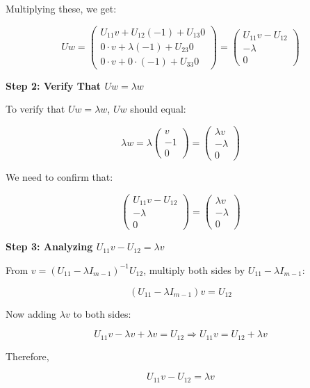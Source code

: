 \documentclass[8pt]{article}
\begin{document}
{{Multiplying these, we get:

\[
Uw = \begin{pmatrix}
U_{11}v + U_{12}(-1) + U_{13}0 \\
0 \cdot v + \lambda(-1) + U_{23}0 \\
0 \cdot v + 0 \cdot (-1) + U_{33}0
\end{pmatrix} = \begin{pmatrix}
U_{11}v - U_{12} \\
-\lambda \\
0
\end{pmatrix}
\]

\textbf{Step 2: Verify That \(Uw = \lambda w\)}

To verify that \(Uw = \lambda w\), \(Uw\) should equal:

\[
\lambda w = \lambda \begin{pmatrix}
v \\
-1 \\
0
\end{pmatrix} = \begin{pmatrix}
\lambda v \\
-\lambda \\
0
\end{pmatrix}
\]

We need to confirm that:

\[
\begin{pmatrix}
U_{11}v - U_{12} \\
-\lambda \\
0
\end{pmatrix} = \begin{pmatrix}
\lambda v \\
-\lambda \\
0
\end{pmatrix}
\]

\textbf{Step 3: Analyzing \(U_{11}v - U_{12} = \lambda v\)}

From \(v = (U_{11} - \lambda I_{m-1})^{-1} U_{12}\), multiply both sides by \(U_{11} - \lambda I_{m-1}\):

\[
(U_{11} - \lambda I_{m-1})v = U_{12}
\]

Now adding \(\lambda v\) to both sides:

\[
U_{11}v - \lambda v + \lambda v = U_{12} \Rightarrow U_{11}v = U_{12} + \lambda v
\]

Therefore,

\[
U_{11}v - U_{12} = \lambda v
\]


}}
\end{document}
